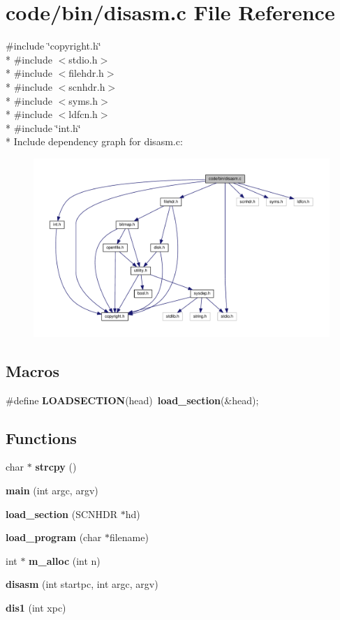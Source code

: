 \section{code/bin/disasm.c File Reference}
\label{disasm_8c}
{\ttfamily \#include \char`\"{}copyright.\+h\char`\"{}}\\*
{\ttfamily \#include $<$stdio.\+h$>$}\\*
{\ttfamily \#include $<$filehdr.\+h$>$}\\*
{\ttfamily \#include $<$scnhdr.\+h$>$}\\*
{\ttfamily \#include $<$syms.\+h$>$}\\*
{\ttfamily \#include $<$ldfcn.\+h$>$}\\*
{\ttfamily \#include \char`\"{}int.\+h\char`\"{}}\\*
Include dependency graph for disasm.\+c\+:
\nopagebreak
\begin{figure}[H]
\begin{center}
\leavevmode
\includegraphics[width=350pt]{disasm_8c__incl}
\end{center}
\end{figure}
\subsection*{Macros}
\begin{DoxyCompactItemize}
\item 
\#define {\bf L\+O\+A\+D\+S\+E\+C\+T\+I\+ON}(head)~{\bf load\+\_\+section}(\&head);
\end{DoxyCompactItemize}
\subsection*{Functions}
\begin{DoxyCompactItemize}
\item 
char $\ast$ {\bf strcpy} ()
\item 
{\bf main} (int argc, argv)
\item 
{\bf load\+\_\+section} (S\+C\+N\+H\+DR $\ast$hd)
\item 
{\bf load\+\_\+program} (char $\ast$filename)
\item 
int $\ast$ {\bf m\+\_\+alloc} (int n)
\item 
{\bf disasm} (int startpc, int argc, argv)
\item 
{\bf dis1} (int xpc)
\end{DoxyCompactItemize}

